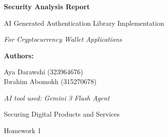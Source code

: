 \documentclass[11pt,a4paper]{article}
\begin{document}
\begin{titlepage}
    \centering
    \vspace*{2cm}
    
    {\Huge\bfseries\color{sectionblue} Security Analysis Report\par}
    \vspace{0.5cm}
    {\Large\color{gray} AI Generated Authentication Library Implementation\par}
    \vspace{0.3cm}
    {\large\color{gray}\textit{For Cryptocurrency Wallet Applications}\par}
    
    \vspace{1.5cm}
    
    
    \vspace{1.5cm}
    
    {\large\textbf{Authors:}\par}
    \vspace{0.3cm}
    {\normalsize
        Aya Darawshi (323964676)\\[5pt]
        Ibrahim Abomokh (315270678)\par
    }
    
    \vspace{1cm}
    
    {\normalsize\textit{AI tool used: Gemini 3 Flash Agent}\par}
    
    \vfill
    
    {\large Securing Digital Products and Services\par}
    \vspace{0.5cm}
    {\large Homework 1\par}
    
\end{titlepage}
\end{document}
